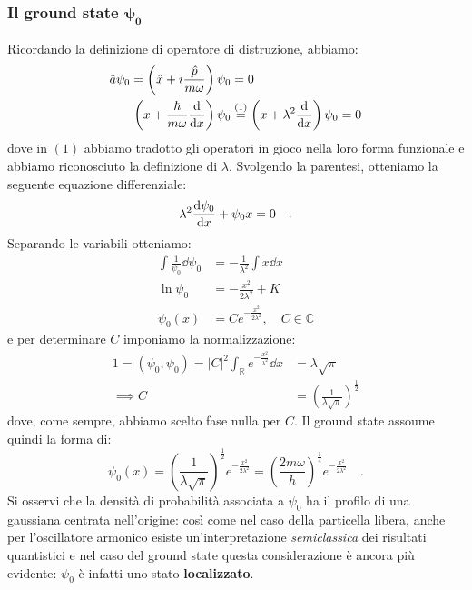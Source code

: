 \subsubsection{Il ground state $\bm{\psi_0}$}
Ricordando la definizione di operatore di distruzione, abbiamo:
\[
\begin{aligned}
    \hat{a}\psi_0 = \left(\hat{x} + i\frac{\hat{p}}{m\omega}\right)\psi_0 &= 0 \\
    \left({x} + \frac{\hbar}{m\omega} \dv{}{x}\right)\psi_0 &\overset{(1)}{=} \left({x} + \lambda^2 \dv{}{x}\right)\psi_0 = 0
\end{aligned}
\]
dove in $(1)$ abbiamo tradotto gli operatori in gioco nella loro forma funzionale e abbiamo riconosciuto la definizione di $\lambda$. Svolgendo la parentesi, otteniamo la seguente equazione differenziale:
\[
    \lambda^2\dv{\psi_0}{x} + \psi_0 x = 0 \quad.
\]
Separando le variabili otteniamo:
\[
    \begin{aligned}
        \int\frac{1}{\psi_0}\dd{\psi_0} &= -\frac{1}{\lambda^2} \int x\dd{x} \\
        \ln{\psi_0} &= -\frac{x^2}{2\lambda^2} + K \\
        \psi_0(x) &= Ce^{-\frac{x^2}{2\lambda^2}}, \quad C \in \mathbb{C}
    \end{aligned}
\]
e per determinare $C$ imponiamo la normalizzazione:
\[
\begin{aligned}
    1 = (\psi_0, \psi_0) = |C|^2 \int_\mathbb{R} e^{-\frac{x^2}{\lambda^2}} \dd{x} &= \lambda\sqrt{ \pi} \\
    \implies C &= \left(\frac{1}{\lambda\sqrt{\pi}}\right)^{\frac{1}{2}}
\end{aligned}
\]
dove, come sempre, abbiamo scelto fase nulla per $C$. Il ground state assoume quindi la forma di:
\begin{equation}
    \psi_0(x) = \left(\frac{1}{\lambda\sqrt{\pi}}\right)^{\frac{1}{2}}e^{-\frac{x^2}{2\lambda^2}} = \left(\frac{2m\omega}{h}\right)^{\frac{1}{4}} e^{-\frac{x^2}{2\lambda^2}}\quad.
\end{equation}
Si osservi che la densità di probabilità associata a $\psi_0$ ha il profilo di una gaussiana centrata nell'origine: così come nel caso della particella libera, anche per l'oscillatore armonico esiste un'interpretazione \emph{semiclassica} dei risultati quantistici e nel caso del ground state questa considerazione è ancora più evidente: $\psi_0$ è infatti uno stato \textbf{localizzato}.

